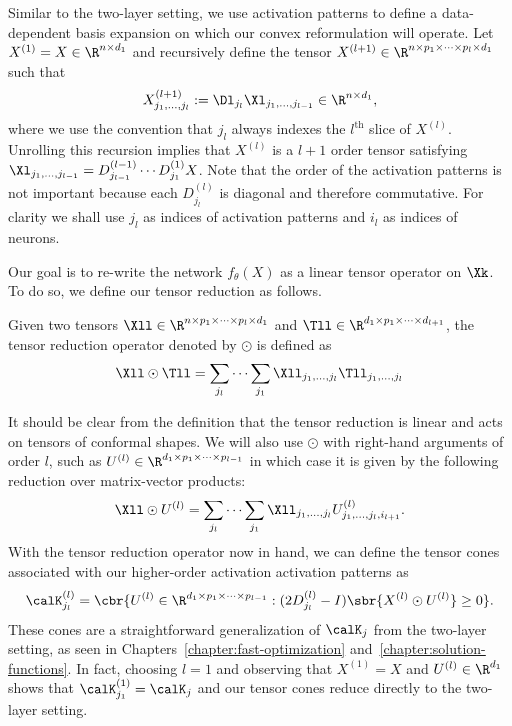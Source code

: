 Similar to the two-layer setting, we use activation patterns to define
a data-dependent basis expansion on which our convex reformulation will
operate.
Let \( X^{(1)} = X \in \R^{n \times d_1} \) and recursively define
the tensor \( X^{(l+1)} \in \R^{n \times p_1 \times \cdots \times p_{l} \times d_1} \)
such that
\begin{equation}\label{eq:data-tensor}
    X^{(l+1)}_{j_1,\ldots, j_l}
    := \Dl_{j_l} \Xl_{j_1, \ldots, j_{l-1}} \in \R^{n \times d_1},
\end{equation}
where we use the convention that \( j_{l} \) always indexes the
\( l^{\text{th}} \) slice of \( X^{(l)} \).
Unrolling this recursion implies that \( X^{(l)} \) is a \( l+1 \) order tensor
satisfying
\( \Xl_{j_1, \ldots, j_{l-1}} = D^{(l-1)}_{j_{l-1}} \cdots D^{(1)}_{j_1} X \).
Note that the order of the activation patterns is not important because
each \( D^{(l)}_{j_l} \) is diagonal and therefore commutative.
For clarity we shall use \( j_l \) as indices of activation patterns
and \( i_l \) as indices of neurons.

Our goal is to re-write the network \( f_\theta(X) \) as a linear tensor
operator on \( \Xk \).
To do so, we define our tensor reduction as follows.
\begin{definition}
    Given two tensors
    \( \Xll \in \R^{n \times p_1 \times \cdots \times p_l \times d_1} \)
    and
    \( \Tll \in \R^{d_1 \times p_1 \times \cdots \times d_{l+1}} \),
    the tensor reduction operator denoted by \( \odot \) is defined as
    \begin{equation}\label{eq:tensor-reduction}
        \Xll \odot \Tll = \sum_{j_{l}} \cdots \sum_{j_{1}}
        \Xll_{j_1, \ldots, j_{l}} \Tll_{j_1, \ldots, j_{l}}
    \end{equation}
\end{definition}
It should be clear from the definition that the tensor reduction is
linear and acts on tensors of conformal shapes.
We will also use \( \odot \) with right-hand arguments of order
\( l \), such as \( U^{(l)} \in \R^{d_1 \times p_1 \times \cdots \times p_{l-1}} \)
in which case it is given by the following reduction over
matrix-vector products:
\[
    \Xll \odot U^{(l)} = \sum_{j_{l}} \cdots \sum_{j_{1}}
    \Xll_{j_1, \ldots, j_{l}} U^{(l)}_{j_1, \ldots, j_{l}, i_{l+1}}.
\]
With the tensor reduction operator now in hand, we can define the tensor cones
associated with our higher-order activation activation patterns as
\begin{equation}\label{eq:tensor-cone}
    \calK^{(l)}_{j_{l}} =
    \cbr{
    U^{(l)} \in \R^{d_1 \times p_{1} \times \cdots \times p_{l-1}}
    :
    (2D^{(l)}_{j_{l}} - I)
    \sbr{X^{(l)} \odot U^{(l)}} \geq 0
    }.
\end{equation}
These cones are a straightforward generalization of \( \calK_j \) from
the two-layer setting, as seen in Chapters~\ref{chapter:fast-optimization}
and~\ref{chapter:solution-functions}.
In fact, choosing \( l = 1 \) and observing that \( X^{(1)} = X \) and
\( U^{(l)} \in \R^{d_1} \) shows that \( \calK^{(1)}_{j_1} = \calK_j \)
and our tensor cones reduce directly to the two-layer setting.

